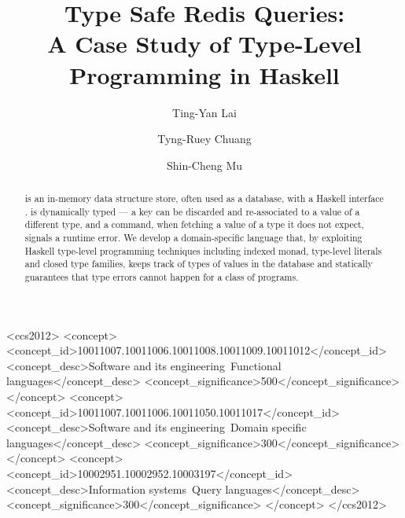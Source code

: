 \documentclass[sigplan]{acmart}
\begin{document}
\title{Type Safe Redis Queries:\\A Case Study of Type-Level Programming in Haskell}


\author{Ting-Yan Lai}

\author{Tyng-Ruey Chuang}

\author{Shin-Cheng Mu}

\begin{abstract}
\Redis{} is an in-memory data structure store, often used as a database, with a
Haskell interface \Hedis{}. \Redis{} is dynamically typed --- a key can be
discarded and re-associated to a value of a different type, and a command,
when fetching a value of a type it does not expect, signals a runtime error. We
develop a domain-specific language that, by exploiting Haskell type-level
programming techniques including indexed monad, type-level literals and closed
type families, keeps track of types of values in the database and statically
guarantees that type errors cannot happen for a class of \Redis{} programs.
\end{abstract}

\begin{CCSXML}
<ccs2012>
<concept>
<concept_id>10011007.10011006.10011008.10011009.10011012</concept_id>
<concept_desc>Software and its engineering~Functional languages</concept_desc>
<concept_significance>500</concept_significance>
</concept>
<concept>
<concept_id>10011007.10011006.10011050.10011017</concept_id>
<concept_desc>Software and its engineering~Domain specific languages</concept_desc>
<concept_significance>300</concept_significance>
</concept>
<concept>
<concept_id>10002951.10002952.10003197</concept_id>
<concept_desc>Information systems~Query languages</concept_desc>
<concept_significance>300</concept_significance>
</concept>
</ccs2012>
\end{CCSXML}
\end{document}
